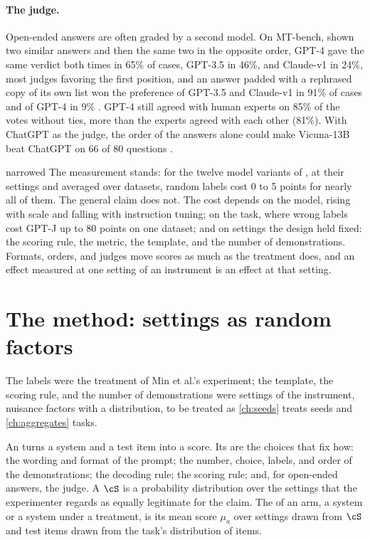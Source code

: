 \begin{refsection}
\paragraph{The judge.} Open-ended answers are often graded by a second model. On MT-bench, shown two similar answers and then the same two in the opposite order, GPT-4 gave the same verdict both times in 65\% of cases, GPT-3.5 in 46\%, and Claude-v1 in 24\%, most judges favoring the first position, and an answer padded with a rephrased copy of its own list won the preference of GPT-3.5 and Claude-v1 in 91\% of cases and of GPT-4 in 9\% \parencite{ZhengEtAl2023}. GPT-4 still agreed with human experts on 85\% of the votes without ties, more than the experts agreed with each other (81\%). With ChatGPT as the judge, the order of the answers alone could make Vicuna-13B beat ChatGPT on 66 of 80 questions \parencite{WangEtAl2024}.

\begin{verdict}{narrowed}
The measurement stands: for the twelve model variants of \textcite{MinEtAl2022}, at their settings and averaged over datasets, random labels cost 0 to 5 points for nearly all of them. The general claim does not. The cost depends on the model, rising with scale and falling with instruction tuning; on the task, where wrong labels cost GPT-J up to 80 points on one dataset; and on settings the design held fixed: the scoring rule, the metric, the template, and the number of demonstrations. Formats, orders, and judges move scores as much as the treatment does, and an effect measured at one setting of an instrument is an effect at that setting.
\end{verdict}

\section{The method: settings as random factors}\label{sec:instruments:settings}

The labels were the treatment of Min et al.'s experiment; the template, the scoring rule, and the number of demonstrations were settings of the instrument, nuisance factors with a distribution, to be treated as \cref{ch:seeds} treats seeds and \cref{ch:aggregates} tasks.

\begin{definition}\label{def:instruments:instrument}
An  turns a system and a test item into a score. Its  are the choices that fix how: the wording and format of the prompt; the number, choice, labels, and order of the demonstrations; the decoding rule; the scoring rule; and, for open-ended answers, the judge. A  $\cS$ is a probability distribution over the settings that the experimenter regards as equally legitimate for the claim. The  of an arm, a system or a system under a treatment, is its mean score $\mu_a$ over settings drawn from $\cS$ and test items drawn from the task's distribution of items.
\end{definition}


\end{refsection}
